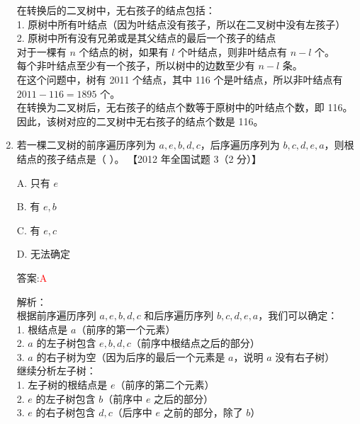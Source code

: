 \documentclass[lang=cn,newtx,10pt,scheme=chinese]{../../../elegantbook}
\begin{document}
\begin{enumerate}
        在转换后的二叉树中，无右孩子的结点包括：\\
        1. 原树中所有叶结点（因为叶结点没有孩子，所以在二叉树中没有左孩子）\\
        2. 原树中所有没有兄弟或是其父结点的最后一个孩子的结点\\
        
        对于一棵有 $n$ 个结点的树，如果有 $l$ 个叶结点，则非叶结点有 $n - l$ 个。\\
        每个非叶结点至少有一个孩子，所以树中的边数至少有 $n - l$ 条。\\
        
        在这个问题中，树有 2011 个结点，其中 116 个是叶结点，所以非叶结点有 $2011 - 116 = 1895$ 个。\\
        
        在转换为二叉树后，无右孩子的结点个数等于原树中的叶结点个数，即 116。\\
        
        因此，该树对应的二叉树中无右孩子的结点个数是 116。\\
    
        \item 若一棵二叉树的前序遍历序列为 $a,e,b,d,c$，后序遍历序列为 $b,c,d,e,a$，则根结点的孩子结点是（ ）。  
        【2012 年全国试题 3（2 分）】 
    
        A. 只有 $e$  
    
        B. 有 $e, b$  
    
        C. 有 $e, c$  
    
        D. 无法确定  
    
        答案:\textcolor{red}{A}
        
        解析：\\
        根据前序遍历序列 $a,e,b,d,c$ 和后序遍历序列 $b,c,d,e,a$，我们可以确定：\\
        1. 根结点是 $a$（前序的第一个元素）\\
        2. $a$ 的左子树包含 $e,b,d,c$（前序中根结点之后的部分）\\
        3. $a$ 的右子树为空（因为后序的最后一个元素是 $a$，说明 $a$ 没有右子树）\\
        
        继续分析左子树：\\
        1. 左子树的根结点是 $e$（前序的第二个元素）\\
        2. $e$ 的左子树包含 $b$（前序中 $e$ 之后的部分）\\
        3. $e$ 的右子树包含 $d,c$（后序中 $e$ 之前的部分，除了 $b$）\\
        

\end{enumerate}
\end{document}
